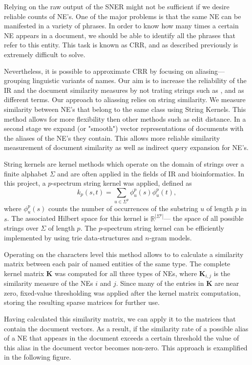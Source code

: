 Relying on the raw output of the SNER might not be sufficient if we desire reliable counts of NE's. One of the major problems is that the same
NE can be manifested in a variety of phrases. In order to know how many times a certain NE appears in a document, we should be able to identify all the phrases that refer to this entity. This task is known as CRR, and as described previously is extremely difficult to solve.

Nevertheless, it is possible to approximate CRR by focusing on aliasing--- grouping linguistic variants of names. Our aim is to increase the reliability of the IR and the document similarity measures by not trating strings such as  ,  and  as different terms. Our approach to aliassing relies on string similarity. We measure similarity between NE's that belong to the same class using String Kernels. This method allows for more flexibility then other methods such as edit distance. In a second stage we expand (or "smooth") vector representations of documents with the aliases of the NE's they contain. This allows more reliable similarity measurement of document similarity as well as indirect query expansion for NE's. 

String kernels are kernel methods which operate on the domain of strings over
a finite alphabet $\Sigma$ and are often applied in the fields of IR and bioinformatics. In this project, a
$p$-spectrum string kernel was applied, defined as
\[k_p(s,t) = \sum_{u \in \Sigma^p}{\phi_u^p(s)\phi_u^p(t)},\]
where $\phi_u^p(s)$ counts the number of occurrences of the substring $u$ of length $p$ in $s$. The
associated Hilbert space for this kernel is $\mathbb{R}^{|\Sigma^p|}$--- the space of all possible
strings over $\Sigma$ of length $p$. The $p$-spectrum string kernel can be efficiently implemented by using trie data-structures and $n$-gram models.

Operating on the characters level this method allows to to calculate a similarity matrix between each pair of named entities of the same type. 
The complete kernel matrix $\textbf{K}$ was computed for all three types of NEs, where $\textbf{K}_{i,j}$ is the similarity measure of the NEs $i$ and $j$. Since many of the entries in $\textbf{K}$ are near zero, fixed-value thresholding was applied after the kernel matrix computation, storing the resulting sparse matrices for further use.

Having calculated this similarity matrix, we can apply it to the matrices that contain the document vectors. As a result, if the similarity rate of a possible alias of a NE that appears in the document exceeds a certain threshold the value of this alias in the document vector becomes non-zero. This approach is examplified in the following figure.


